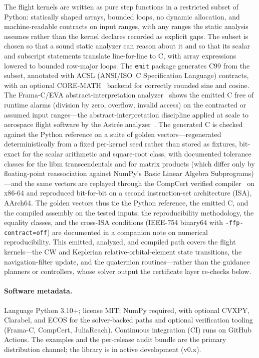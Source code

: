 \documentclass[11pt]{article}
\begin{document}
The flight kernels are written as pure step functions in a restricted subset of
Python: statically shaped arrays, bounded loops, no dynamic allocation, and
machine-readable contracts on input ranges, with any ranges the static analysis
assumes rather than the kernel declares recorded as explicit gaps. The subset is chosen
so that a sound static analyzer can reason about it and so that its scalar and
subscript statements translate line-for-line to C, with array expressions lowered
to bounded row-major loops. The \texttt{emit} package generates C99 from the subset,
annotated with ACSL (ANSI/ISO~C Specification Language) contracts, with an optional
CORE-MATH~\cite{coremath2022} backend for correctly rounded sine and cosine. The
Frama-C/EVA abstract-interpretation analyzer~\cite{framac2015} shows the emitted C
free of runtime alarms (division by zero, overflow, invalid access) on the
contracted or assumed input ranges---the abstract-interpretation discipline
applied at scale to aerospace flight software by the Astr{\'e}e
analyzer~\cite{bertrane2015aerospace}. The generated C is checked against the Python
reference on a suite of golden vectors---regenerated deterministically from a fixed
per-kernel seed rather than stored as fixtures, bit-exact for the scalar arithmetic and
square-root class, with documented tolerance classes for the libm transcendentals
and for matrix products (which differ only by floating-point reassociation against
NumPy's Basic Linear Algebra Subprograms)---and the same vectors are replayed
through the CompCert verified compiler~\cite{compcert2009,boldo2015fpcompile} on x86-64 and reproduced
bit-for-bit on a second instruction-set architecture (ISA), AArch64. The golden
vectors thus tie the Python reference, the emitted C, and the compiled assembly on
the tested inputs; the reproducibility methodology, the equality classes, and the
cross-ISA conditions (IEEE-754 binary64 with \texttt{-ffp-contract=off}) are
documented in a companion note on numerical reproducibility. This emitted, analyzed, and
compiled path covers the flight kernels---the CW and Keplerian relative-orbital-element
state transitions, the navigation-filter update, and the quaternion routines---rather than the
guidance planners or controllers, whose solver output the certificate layer
re-checks below.

\paragraph{Software metadata.}
Language Python 3.10+; license
MIT; NumPy required, with optional CVXPY, Clarabel, and ECOS for the
solver-backed paths and optional verification tooling (Frama-C, CompCert,
JuliaReach). Continuous integration (CI) runs
on GitHub Actions. The examples and the per-release audit bundle are the primary
distribution channel; the library is in active development (v0.x).
\end{document}
